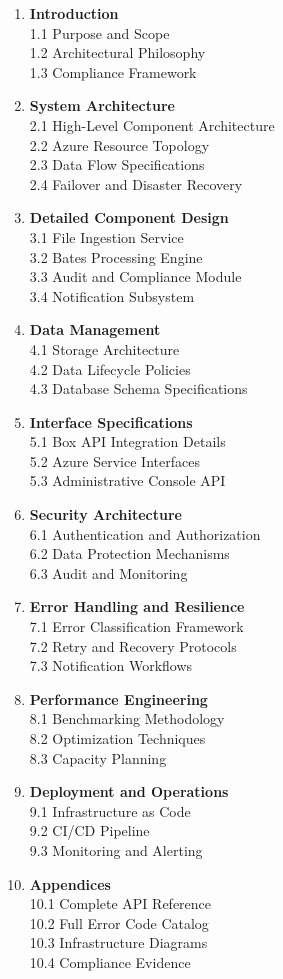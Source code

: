 \documentclass[
]{article}
\begin{document}
\begin{enumerate}
\def\labelenumi{\arabic{enumi}.}
\item
  \textbf{Introduction}\\
  1.1 Purpose and Scope\\
  1.2 Architectural Philosophy\\
  1.3 Compliance Framework
\item
  \textbf{System Architecture}\\
  2.1 High-Level Component Architecture\\
  2.2 Azure Resource Topology\\
  2.3 Data Flow Specifications\\
  2.4 Failover and Disaster Recovery
\item
  \textbf{Detailed Component Design}\\
  3.1 File Ingestion Service\\
  3.2 Bates Processing Engine\\
  3.3 Audit and Compliance Module\\
  3.4 Notification Subsystem
\item
  \textbf{Data Management}\\
  4.1 Storage Architecture\\
  4.2 Data Lifecycle Policies\\
  4.3 Database Schema Specifications
\item
  \textbf{Interface Specifications}\\
  5.1 Box API Integration Details\\
  5.2 Azure Service Interfaces\\
  5.3 Administrative Console API
\item
  \textbf{Security Architecture}\\
  6.1 Authentication and Authorization\\
  6.2 Data Protection Mechanisms\\
  6.3 Audit and Monitoring
\item
  \textbf{Error Handling and Resilience}\\
  7.1 Error Classification Framework\\
  7.2 Retry and Recovery Protocols\\
  7.3 Notification Workflows
\item
  \textbf{Performance Engineering}\\
  8.1 Benchmarking Methodology\\
  8.2 Optimization Techniques\\
  8.3 Capacity Planning
\item
  \textbf{Deployment and Operations}\\
  9.1 Infrastructure as Code\\
  9.2 CI/CD Pipeline\\
  9.3 Monitoring and Alerting
\item
  \textbf{Appendices}\\
  10.1 Complete API Reference\\
  10.2 Full Error Code Catalog\\
  10.3 Infrastructure Diagrams\\
  10.4 Compliance Evidence
\end{enumerate}
\end{document}
